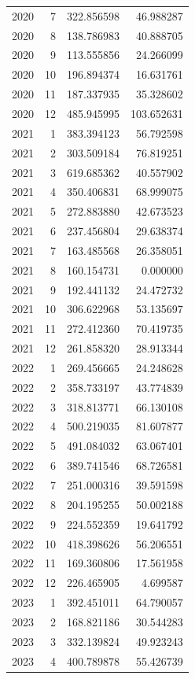 \begin{tabular}{rrrr}
2020 & 7 & 322.856598 & 46.988287 \\
2020 & 8 & 138.786983 & 40.888705 \\
2020 & 9 & 113.555856 & 24.266099 \\
2020 & 10 & 196.894374 & 16.631761 \\
2020 & 11 & 187.337935 & 35.328602 \\
2020 & 12 & 485.945995 & 103.652631 \\
2021 & 1 & 383.394123 & 56.792598 \\
2021 & 2 & 303.509184 & 76.819251 \\
2021 & 3 & 619.685362 & 40.557902 \\
2021 & 4 & 350.406831 & 68.999075 \\
2021 & 5 & 272.883880 & 42.673523 \\
2021 & 6 & 237.456804 & 29.638374 \\
2021 & 7 & 163.485568 & 26.358051 \\
2021 & 8 & 160.154731 & 0.000000 \\
2021 & 9 & 192.441132 & 24.472732 \\
2021 & 10 & 306.622968 & 53.135697 \\
2021 & 11 & 272.412360 & 70.419735 \\
2021 & 12 & 261.858320 & 28.913344 \\
2022 & 1 & 269.456665 & 24.248628 \\
2022 & 2 & 358.733197 & 43.774839 \\
2022 & 3 & 318.813771 & 66.130108 \\
2022 & 4 & 500.219035 & 81.607877 \\
2022 & 5 & 491.084032 & 63.067401 \\
2022 & 6 & 389.741546 & 68.726581 \\
2022 & 7 & 251.000316 & 39.591598 \\
2022 & 8 & 204.195255 & 50.002188 \\
2022 & 9 & 224.552359 & 19.641792 \\
2022 & 10 & 418.398626 & 56.206551 \\
2022 & 11 & 169.360806 & 17.561958 \\
2022 & 12 & 226.465905 & 4.699587 \\
2023 & 1 & 392.451011 & 64.790057 \\
2023 & 2 & 168.821186 & 30.544283 \\
2023 & 3 & 332.139824 & 49.923243 \\
2023 & 4 & 400.789878 & 55.426739 \\

\end{tabular}
